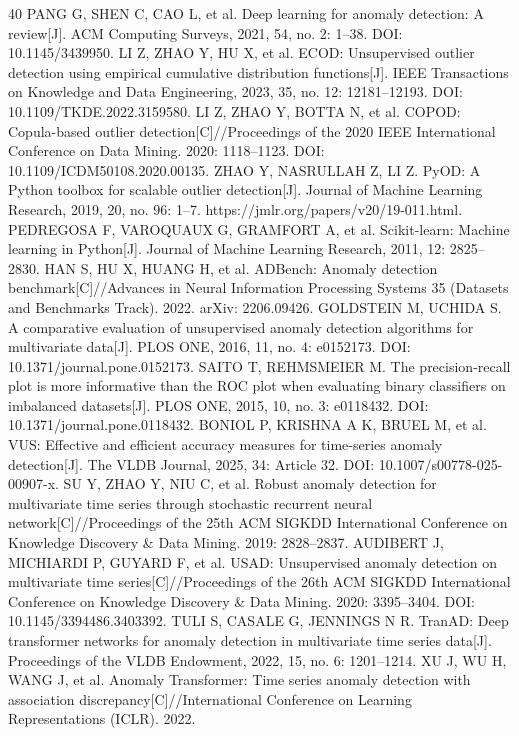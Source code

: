 \documentclass[a4paper,fleqn]{cas-dc}
\begin{document}
\begin{thebibliography}{40}
 PANG G, SHEN C, CAO L, et al. Deep learning for anomaly detection: A review[J]. ACM Computing Surveys, 2021, 54, no. 2: 1–38. DOI: 10.1145/3439950.
 LI Z, ZHAO Y, HU X, et al. ECOD: Unsupervised outlier detection using empirical cumulative distribution functions[J]. IEEE Transactions on Knowledge and Data Engineering, 2023, 35, no. 12: 12181–12193. DOI: 10.1109/TKDE.2022.3159580.
 LI Z, ZHAO Y, BOTTA N, et al. COPOD: Copula-based outlier detection[C]//Proceedings of the 2020 IEEE International Conference on Data Mining. 2020: 1118–1123. DOI: 10.1109/ICDM50108.2020.00135.
 ZHAO Y, NASRULLAH Z, LI Z. PyOD: A Python toolbox for scalable outlier detection[J]. Journal of Machine Learning Research, 2019, 20, no. 96: 1–7. https://jmlr.org/papers/v20/19-011.html.
 PEDREGOSA F, VAROQUAUX G, GRAMFORT A, et al. Scikit-learn: Machine learning in Python[J]. Journal of Machine Learning Research, 2011, 12: 2825–2830.
 HAN S, HU X, HUANG H, et al. ADBench: Anomaly detection benchmark[C]//Advances in Neural Information Processing Systems 35 (Datasets and Benchmarks Track). 2022. arXiv: 2206.09426.
 GOLDSTEIN M, UCHIDA S. A comparative evaluation of unsupervised anomaly detection algorithms for multivariate data[J]. PLOS ONE, 2016, 11, no. 4: e0152173. DOI: 10.1371/journal.pone.0152173.
 SAITO T, REHMSMEIER M. The precision-recall plot is more informative than the ROC plot when evaluating binary classifiers on imbalanced datasets[J]. PLOS ONE, 2015, 10, no. 3: e0118432. DOI: 10.1371/journal.pone.0118432.
 BONIOL P, KRISHNA A K, BRUEL M, et al. VUS: Effective and efficient accuracy measures for time-series anomaly detection[J]. The VLDB Journal, 2025, 34: Article 32. DOI: 10.1007/s00778-025-00907-x.
 SU Y, ZHAO Y, NIU C, et al. Robust anomaly detection for multivariate time series through stochastic recurrent neural network[C]//Proceedings of the 25th ACM SIGKDD International Conference on Knowledge Discovery \& Data Mining. 2019: 2828–2837.
 AUDIBERT J, MICHIARDI P, GUYARD F, et al. USAD: Unsupervised anomaly detection on multivariate time series[C]//Proceedings of the 26th ACM SIGKDD International Conference on Knowledge Discovery \& Data Mining. 2020: 3395–3404. DOI: 10.1145/3394486.3403392.
 TULI S, CASALE G, JENNINGS N R. TranAD: Deep transformer networks for anomaly detection in multivariate time series data[J]. Proceedings of the VLDB Endowment, 2022, 15, no. 6: 1201–1214.
 XU J, WU H, WANG J, et al. Anomaly Transformer: Time series anomaly detection with association discrepancy[C]//International Conference on Learning Representations (ICLR). 2022.

\end{thebibliography}
\end{document}
